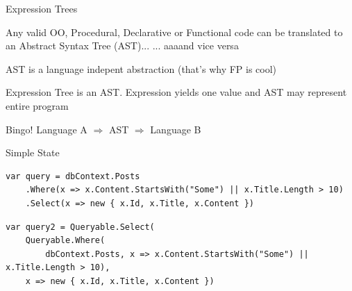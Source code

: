 \documentclass{bredelebeamer}
\begin{document}
\begin{frame}{Expression Trees}
    \begin{block}{Any valid OO, Procedural, Declarative or Functional code}
        can be translated to an Abstract Syntax Tree (AST)...
        \pause  ... aaaand vice versa
    \end{block}
    \pause
    \begin{block}{AST}
        is a language indepent abstraction \pause (that's why FP is cool)
    \end{block}
    \pause
    \begin{block}{Expression Tree}
        is an AST. Expression yields one value and AST may represent entire program
    \end{block}
    
    \begin{alertblock}{Bingo!}
        Language A $\Rightarrow$ AST $\Rightarrow$ Language B
    \end{alertblock}
\end{frame}

\begin{frame}[fragile]{Simple State}
    \begin{lstlisting}
var query = dbContext.Posts
    .Where(x => x.Content.StartsWith("Some") || x.Title.Length > 10)
    .Select(x => new { x.Id, x.Title, x.Content })
    \end{lstlisting}
    \pause
    \begin{lstlisting}
var query2 = Queryable.Select(
    Queryable.Where(
        dbContext.Posts, x => x.Content.StartsWith("Some") || x.Title.Length > 10),
    x => new { x.Id, x.Title, x.Content })
    \end{lstlisting}
\end{frame}
\end{document}
